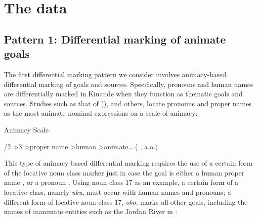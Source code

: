 \documentclass[output=paper]{langscibook}
\begin{document}
\section{The data}\label{sec:schneider:section2Data}

\subsection{Pattern 1: Differential marking of animate goals}\label{sec:schneider:subsection2.1Differentialmarkingofanimategoals}

The first differential marking pattern we consider involves animacy-based differential marking of goals and sources. Specifically, pronouns and human names are differentially marked in Kinande when they function as thematic goals and sources. Studies such as that of \citeauthor{Aissen2003} (\citeyear{Aissen2003}), and others, locate pronouns and proper names as the most animate nominal expressions on a scale of animacy:

\ea \label{ex:AnimacyScale}
Animacy Scale

\begin{xlist}

/2 \textgreater 3 \textgreater  proper name \textgreater human  \textgreater animate… \hfill (\citeauthor{Aissen2003} \citeyear{Aissen2003}, a.o.)

\end{xlist}
\z

This type of animacy-based differential marking requires the use of a certain form of the locative noun class marker just in case the goal is either a human proper name , or a pronoun .  Using noun class 17 as an example, a certain form of a locative class, namely \textit{uku}, must occur with human names and pronouns; a different form of locative noun class 17, \textit{oko}, marks all other goals, including the names of inanimate entities such as the Jordan River in :
\end{document}
